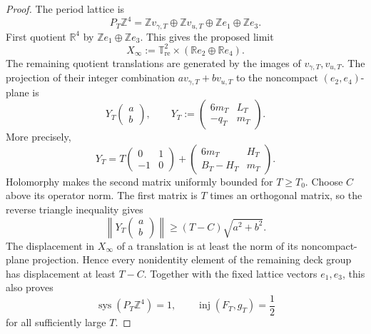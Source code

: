 \begin{proof}
The period lattice is
\begin{equation}
 P_T\mathbb Z^4
 =\mathbb Zv_{\gamma,T}\oplus\mathbb Zv_{u,T}
  \oplus\mathbb Ze_1\oplus\mathbb Ze_3.
 \label{cusp-spec-primal-lattice-decomposition}
\end{equation}
First quotient \(\mathbb R^4\) by
\(\mathbb Ze_1\oplus\mathbb Ze_3\).  This gives the proposed limit
\[
 X_\infty:=\mathbb T^2_{\mathrm{re}}
 \times(\mathbb Re_2\oplus\mathbb Re_4).
\]
The remaining quotient translations are generated by the images of
\(v_{\gamma,T},v_{u,T}\).  The projection of their integer combination
\(av_{\gamma,T}+bv_{u,T}\) to the noncompact
\((e_2,e_4)\)-plane is
\begin{equation}
 Y_T\begin{pmatrix}a\\b\end{pmatrix},
 \qquad
 Y_T:=\begin{pmatrix}6m_T&L_T\\-q_T&m_T\end{pmatrix}.
 \label{cusp-spec-long-plane-matrix}
\end{equation}
More precisely,
\begin{equation}
 Y_T
 =T\begin{pmatrix}0&1\\-1&0\end{pmatrix}
 +\begin{pmatrix}6m_T&H_T\\B_T-H_T&m_T\end{pmatrix}.
 \label{cusp-spec-long-plane-limit}
\end{equation}
Holomorphy makes the second matrix uniformly bounded for \(T\ge T_0\).
Choose \(C\) above its operator norm.  The first matrix is \(T\) times an
orthogonal matrix, so the reverse triangle inequality gives
\begin{equation}
 \left\lVert Y_T\begin{pmatrix}a\\b\end{pmatrix}\right\rVert
 \ge(T-C)\sqrt{a^2+b^2}.
 \label{cusp-spec-long-plane-lower-bound}
\end{equation}
The displacement in \(X_\infty\) of a translation is at least the norm of
its noncompact-plane projection.  Hence every nonidentity element of the
remaining deck group has displacement at least \(T-C\).
Together with the fixed lattice vectors \(e_1,e_3\), this also proves
\begin{equation}
 \operatorname{sys}(P_T\mathbb Z^4)=1,
 \qquad \operatorname{inj}(F_T,g_T)=\frac12
 \label{cusp-spec-original-injectivity-radius}
\end{equation}
for all sufficiently large \(T\).


\end{proof}
